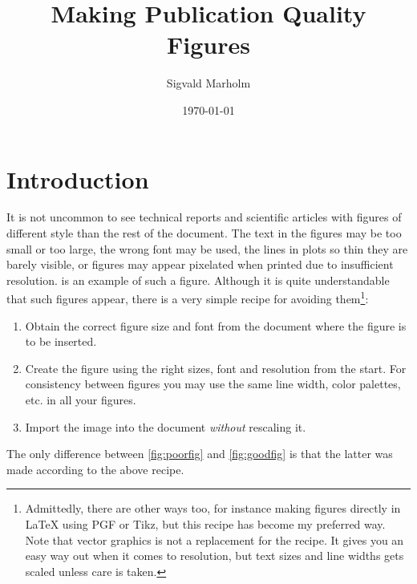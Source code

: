 \documentclass[a4paper,twocolumn]{article}
\title{Making Publication Quality Figures}
\author{Sigvald Marholm}
\date{\today}
\begin{document}
\maketitle
\pagebreak

\section{Introduction}
It is not uncommon to see technical reports and scientific articles with figures of different style than the rest of the document.
The text in the figures may be too small or too large, the wrong font may be used, the lines in plots so thin they are barely visible, or figures may appear pixelated when printed due to insufficient resolution.
 is an example of such a figure.
Although it is quite understandable that such figures appear, there is a very simple recipe for avoiding them\footnote{Admittedly, there are other ways too, for instance making figures directly in \LaTeX{} using PGF or Tikz, but this recipe has become my preferred way. Note that vector graphics is not a replacement for the recipe. It gives you an easy way out when it comes to resolution, but text sizes and line widths gets scaled unless care is taken.}:
\begin{enumerate}
    \item Obtain the correct figure size and font from the document where the figure is to be inserted.
    \item Create the figure using the right sizes, font and resolution from the start. For consistency between figures you may use the same line width, color palettes, etc. in all your figures.
    \item Import the image into the document \emph{without} rescaling it.
\end{enumerate}
The only difference between \cref{fig:poorfig} and \cref{fig:goodfig} is that the latter was made according to the above recipe.
\end{document}
